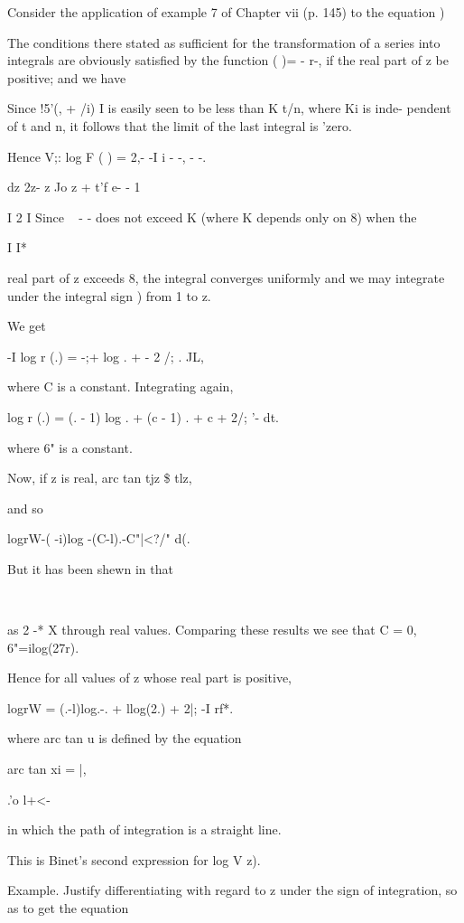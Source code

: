 Consider the application of example 7 of Chapter vii (p. 145) to the
equation )

The conditions there stated as sufficient for the transformation of a
series into integrals are obviously satisfied by the function ( )= -
r-, if the real part of z be positive; and we have

Since !5'(, + /i) I is easily seen to be less than K t/n, where Ki is
inde- pendent of t and n, it follows that the limit of the last
integral is 'zero.

Hence V;: log F ( ) = 2,- -I i - -, - -.

dz 2z- z Jo z + t'f e- - 1

I 2 I Since ~ - - does not exceed K (where K depends only on 8) when
the

I I*

real part of z exceeds 8, the integral converges uniformly and we may
integrate under the integral sign ) from 1 to z.

We get

-I log r (.) = -;+ log . + - 2 /; . JL,

where C is a constant. Integrating again,

log r (.) = (. - 1) log . + (c - 1) . + c + 2/; '- dt.

where 6" is a constant.

%
%

Now, if z is real, arc tan tjz \$ tlz,

and so

logrW-( -i)log -(C-l).-C"|<?/" d(.

But it has been shewn in  that

\ \ %

as 2 -* X through real values. Comparing these results we see that C =
0, 6"=ilog(27r).

Hence for all values of z whose real part is positive,

logrW = (.-l)log.-. + llog(2.) + 2|; -I rf*.

where arc tan u is defined by the equation

arc tan xi = |,

.'o l+<-

in which the path of integration is a straight line.

This is Binet's second expression for log V z).

Example. Justify differentiating with regard to z under the sign of
integration, so as to get the equation

